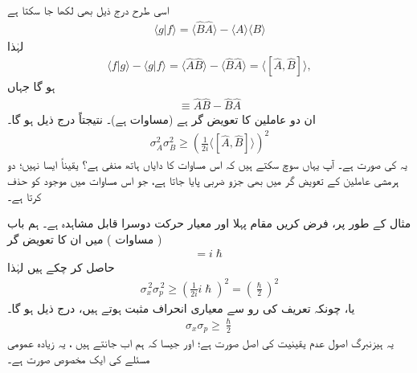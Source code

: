 اسی طرح درج ذیل بھی لکھا جا سکتا ہے 
\begin{align*}
\langle g|f \rangle = \langle \hat{B}\hat{A} \rangle - \langle A \rangle \langle B \rangle 
\end{align*}
لہٰذا 
\begin{align*}
\langle f|g \rangle - \langle g|f \rangle = \langle \hat{A}\hat{B} \rangle -\langle \hat{B}\hat{A} \rangle = \langle [ \hat{A} , \hat{B}] \rangle ,
\end{align*}
ہو گا جہاں
\begin{align*}
[\hat{A} , \hat{B}] \equiv \hat{A} \hat{B} - \hat{B}\hat{A}
\end{align*}
 ان دو عاملین کا تعویض گر ہے (مساوات  ہے)۔ نتیجتاً درج ذیل ہو گا۔
\begin{align}\label{مساوات_قواعد_عمومی_اصول_عدم_یقینیت_الف_بے}
\sigma_{A}^{2} \sigma_{B}^{2} \geq \left(\frac{1}{2i} \langle [\hat{A} , \hat{B}] \rangle \right)^{2}
\end{align}
یہ  کی صورت ہے۔ آپ یہاں سوچ سکتے ہیں کہ اس مساوات کا دایاں ہاتھ منفی ہے؟ یقیناً ایسا نہیں؛ دو ہرمشی عاملین کے تعویض گر میں بھی    جزو ضربی  پایا جاتا ہے،  جو اس مساوات میں موجود  کو حذف کرتا  ہے۔ 

مثال کے طور پر، فرض کریں مقام  پہلا اور معیار حرکت  دوسرا قابل مشاہدہ ہے۔ ہم باب  ( مساوات ) میں ان کا تعویض گر
\begin{align*}
[ \hat{x}, \hat{p} ] = i \hslash
\end{align*}
حاصل کر چکے ہیں لہٰذا
\begin{align*}
\sigma_{x}^{\,2} \sigma_{p}^{\,2} \geq \left( \frac{1}{2i} i \hslash \right)^{2} = \left( \frac{\hslash}{2} \right)^{2}
\end{align*}
یا، چونکہ تعریف کی رو سے معیاری انحراف مثبت ہوتے ہیں، درج ذیل ہو گا۔
\begin{align}
\sigma_{x} \sigma_{p} \geq \frac{\hslash}{2}
\end{align}
یہ  ہیزنبرگ اصول عدم یقینیت کی اصل صورت  ہے؛ اور جیسا  کہ ہم اب جانتے ہیں ، یہ  زیادہ عمومی مسئلے کی ایک مخصوص صورت ہے۔

